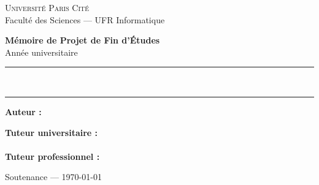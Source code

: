 \begin{titlepage}
\centering
\vspace*{1cm}


\vspace{1.2cm}
{\Large \textsc{Université Paris Cité}}\\[0.4em]
{\large Faculté des Sciences --- UFR Informatique}\\[0.4em]
{\large \memProgram}

\vspace{2.5cm}
{\large \textbf{Mémoire de Projet de Fin d'Études}}\\[0.4em]
{\large Année universitaire \memYear}

\vspace{2cm}
\rule{\linewidth}{0.5mm}\\[0.6em]
{\huge\bfseries\color{anssi} \memTitle\par}
\vspace{0.6em}
{\large\itshape \memSubtitle\par}
\rule{\linewidth}{0.5mm}

\vspace{2.5cm}

\begin{minipage}{0.45\textwidth}
\begin{flushleft}
\textbf{Auteur :}\\
\memAuthor
\end{flushleft}
\end{minipage}\hfill
\begin{minipage}{0.45\textwidth}
\begin{flushright}
\textbf{Tuteur universitaire :}\\
\memTutor\\[0.6em]
\textbf{Tuteur professionnel :}\\
\memCompany
\end{flushright}
\end{minipage}

\vfill
{\large Soutenance --- \today}
\end{titlepage}
